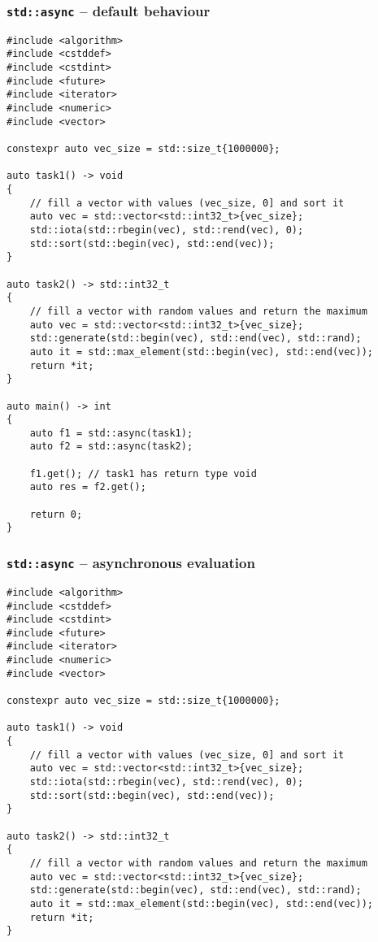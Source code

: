 \begin{appendix}
\subsubsection{\texttt{std::async} -- default behaviour}\label{app:scorep_conc_async_default}

\begin{lstlisting}
#include <algorithm>
#include <cstddef>
#include <cstdint>
#include <future>
#include <iterator>
#include <numeric>
#include <vector>

constexpr auto vec_size = std::size_t{1000000};

auto task1() -> void
{
    // fill a vector with values (vec_size, 0] and sort it
    auto vec = std::vector<std::int32_t>{vec_size};
    std::iota(std::rbegin(vec), std::rend(vec), 0);
    std::sort(std::begin(vec), std::end(vec));
}

auto task2() -> std::int32_t
{
    // fill a vector with random values and return the maximum
    auto vec = std::vector<std::int32_t>{vec_size};
    std::generate(std::begin(vec), std::end(vec), std::rand);
    auto it = std::max_element(std::begin(vec), std::end(vec));
    return *it;
}

auto main() -> int
{
    auto f1 = std::async(task1);
    auto f2 = std::async(task2);
    
    f1.get(); // task1 has return type void
    auto res = f2.get();
    
    return 0;
}
\end{lstlisting}

\subsubsection{\texttt{std::async} -- asynchronous evaluation}\label{app:scorep_conc_async_async}

\begin{lstlisting}
#include <algorithm>
#include <cstddef>
#include <cstdint>
#include <future>
#include <iterator>
#include <numeric>
#include <vector>

constexpr auto vec_size = std::size_t{1000000};

auto task1() -> void
{
    // fill a vector with values (vec_size, 0] and sort it
    auto vec = std::vector<std::int32_t>{vec_size};
    std::iota(std::rbegin(vec), std::rend(vec), 0);
    std::sort(std::begin(vec), std::end(vec));
}

auto task2() -> std::int32_t
{
    // fill a vector with random values and return the maximum
    auto vec = std::vector<std::int32_t>{vec_size};
    std::generate(std::begin(vec), std::end(vec), std::rand);
    auto it = std::max_element(std::begin(vec), std::end(vec));
    return *it;
}


\end{lstlisting}
\end{appendix}
